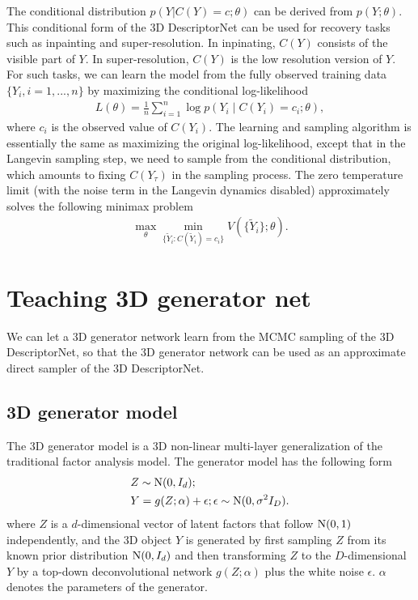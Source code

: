 \documentclass[10pt,twocolumn,letterpaper]{article}
\def\tY{\tilde{Y}}
\begin{document}
 The conditional distribution $p(Y | C(Y) = c; \theta)$ can be derived from $p(Y; \theta)$. This conditional form of the 3D DescriptorNet can be used for recovery tasks such as inpainting and super-resolution. In inpinating, $C(Y)$ consists of the visible part of $Y$. In super-resolution, $C(Y)$ is the low resolution version of $Y$. For such tasks, we can learn the model from the fully observed training data $\{Y_i, i = 1, ..., n\}$ by maximizing the conditional log-likelihood 
 \begin{eqnarray}
     L(\theta) = \frac{1}{n} \sum_{i=1}^{n} \log p(Y_i \mid C(Y_i) = c_i; \theta), 
 \end{eqnarray} 
 where $c_i$ is the observed value of $C(Y_i)$. 
The learning and sampling algorithm is essentially the same as maximizing the original log-likelihood, except that in the Langevin sampling step, we need to sample from the conditional distribution, which amounts to fixing $C(Y_\tau)$ in the sampling process. 
The  zero temperature limit (with the noise term in the Langevin dynamics disabled) approximately solves the following minimax problem 
  \begin{eqnarray} 
\max_{\theta} \min_{\{\tY_i: C(\tY_i) = {c}_i\}}  V(\{\tY_i\}; \theta).  \label{eq:minimax1}
\end{eqnarray}





\section{Teaching 3D generator net}


We can let a 3D generator network learn from the MCMC sampling of the 3D DescriptorNet, so that the 3D generator network can be used as an approximate direct sampler of the 3D DescriptorNet. 

\subsection{3D generator model} 

The 3D generator model \cite{goodfellow2014generative} is a 3D non-linear multi-layer generalization of the traditional factor analysis model. The generator model has the following form
\begin{eqnarray} 
& Z \sim {\rm N}(0, I_d);\nonumber \\ 
 & Y = g(Z; \alpha)  + \epsilon; \epsilon \sim {\rm N}(0, \sigma^2 I_D). \label{eq:NFA}
 \end{eqnarray}
 where $Z$ is a $d$-dimensional vector of latent factors that follow ${\rm N}(0, 1)$ independently, and the 3D object $Y$ is generated by first sampling $Z$ from its known prior distribution ${\rm N}(0, I_d)$ and then transforming $Z$ to the $D$-dimensional $Y$ by a top-down deconvolutional network $g(Z; \alpha)$ plus the white noise $\epsilon$.  $\alpha$ denotes the parameters of the generator.
\end{document}
